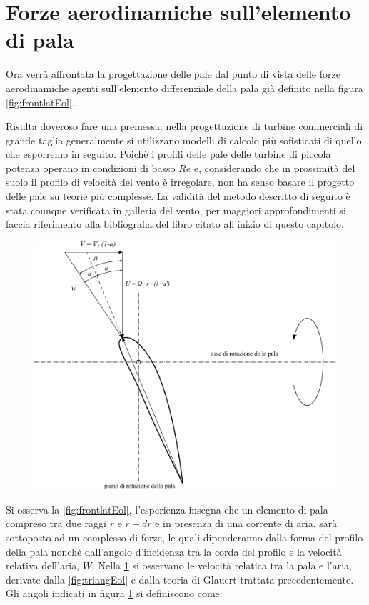 \section{Forze aerodinamiche sull'elemento di pala}
Ora verrà affrontata la progettazione delle pale dal punto di vista delle forze aerodinamiche agenti sull'elemento differenziale della pala già definito nella figura \ref{fig:frontlatEol}. 

Risulta doveroso fare una premessa: nella progettazione di turbine commerciali di grande taglia generalmente si utilizzano modelli di calcolo più sofisticati di quello che esporremo in seguito. 
Poichè i profili delle pale delle turbine di piccola potenza operano in condizioni di basso $Re$ e, considerando che in prossimità del suolo il profilo di velocità del vento è irregolare, non ha senso basare il progetto delle pale su teorie più complesse. 
La validità del metodo descritto di seguito è stata counque verificata in galleria del vento, per maggiori approfondimenti si faccia riferimento alla bibliografia del libro citato all'inizio di questo capitolo. 
\begin{figure}[h!]
\centering
  \includegraphics[width=.7\textwidth]{fig/triangEol2.pdf}
\caption{}
\label{fig:triangEol2}
\end{figure}
Si osserva la \ref{fig:frontlatEol}, l'esperienza insegna che un elemento di pala compreso tra due raggi $r$ e $r+dr$ e in presenza di una corrente di aria, sarà sottoposto ad un complesso di forze, le quali dipenderanno dalla forma del profilo della pala nonchè dall'angolo d'incidenza tra la corda del profilo e la velocità relativa dell'aria, $W$. Nella \ref{fig:triangEol2} si osservano le velocità relatica tra la pala e l'aria, derivate dalla \ref{fig:triangEol} e dalla teoria di Glauert trattata precedentemente. 
Gli angoli indicati in figura \ref{fig:triangEol2} si definiscono come:\\
